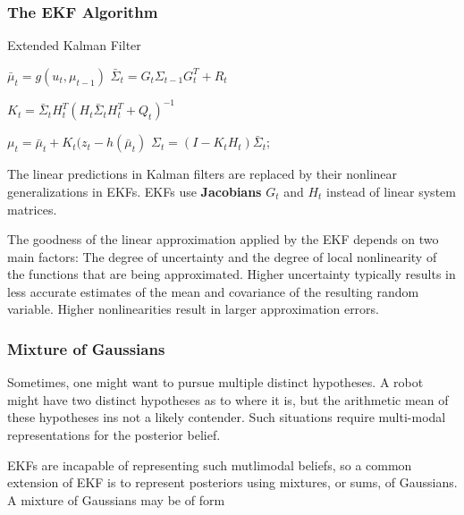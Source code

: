 \subsubsection{The EKF Algorithm}

\begin{algorithm}[H]
\caption{Extended Kalman Filter}

\BlankLine
{}
$\bar{\mu}_t = g(u_t, \mu_{t-1})$\;
$\bar{\Sigma}_t = G_t \Sigma_{t-1} G_t^T + R_t$\;

\BlankLine
{}
$K_t = \bar{\Sigma}_t H_t^T (H_t \bar{\Sigma}_t H_t^T + Q_t)^{-1}$\;

\BlankLine
{}
$\mu_t = \bar{\mu}_t + K_t (z_t -  h(\bar{\mu}_t)$\;
$\Sigma_t = (I - K_t H_t)\bar{\Sigma}_t$;\

\BlankLine
{}
\end{algorithm}

\vspace{2mm}

The linear predictions in Kalman filters are replaced by their nonlinear generalizations in EKFs.
EKFs use \textbf{Jacobians} $G_t$ and $H_t$ instead of linear system matrices.

The goodness of the linear approximation applied by the EKF depends on two main factors:
The degree of uncertainty and the degree of local nonlinearity of the functions that are being approximated.
Higher uncertainty typically results in less accurate estimates of the mean and covariance of the resulting random variable.
Higher nonlinearities result in larger approximation errors.

\subsubsection{Mixture of Gaussians}

Sometimes, one might want to pursue multiple distinct hypotheses.
A robot might have two distinct hypotheses as to where it is, but the arithmetic mean of these hypotheses ins not a likely contender.
Such situations require multi-modal representations for the posterior belief.

EKFs are incapable of representing such mutlimodal beliefs, so a common extension of EKF is to represent posteriors using mixtures, or sums, of Gaussians.
A mixture of Gaussians may be of form

